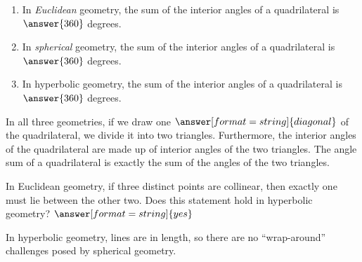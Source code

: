 \documentclass{ximera}
\begin{document}
\begin{problem}
\begin{enumerate}
\item In \emph{Euclidean} geometry, the sum of the interior angles of a quadrilateral is 
$\answer{360}$ degrees.
\item In \emph{spherical} geometry, the sum of the interior angles of a quadrilateral is 
$\answer{360}$ degrees.
\item In hyperbolic geometry, the sum of the interior angles of a quadrilateral is 
$\answer{360}$ degrees.
\end{enumerate}
\begin{problem}
In all three geometries, if we draw one $\answer[format=string]{diagonal}$ of the quadrilateral, we divide it into two triangles.  Furthermore, the interior angles of the quadrilateral are made up of interior angles of the two triangles.  The angle sum of a quadrilateral is exactly the sum of the angles of the two triangles.  
\end{problem}
\end{problem}

\begin{problem} %
In Euclidean geometry, if three distinct points are collinear, then exactly one must lie between the other two.  Does this statement hold in hyperbolic geometry? 
$\answer[format=string]{yes}$
\begin{feedback}[correct]
In hyperbolic geometry, lines are  in length, so there are no ``wrap-around'' challenges posed by spherical geometry.  
\end{feedback}
\end{problem}


\end{document}
